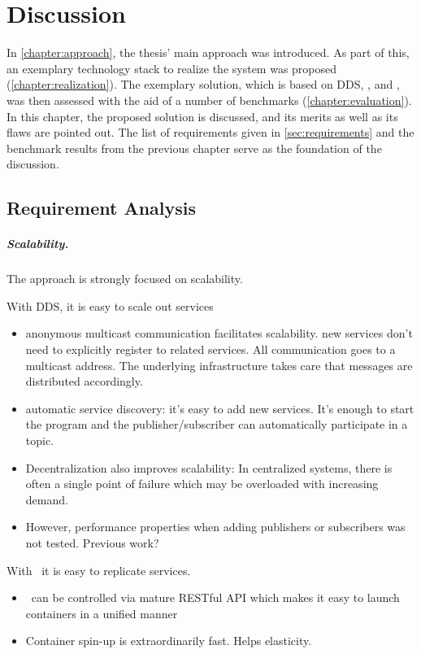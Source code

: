 \chapter{Discussion}\label{chapter:discussion}
In \autoref{chapter:approach}, the thesis' main approach was introduced. As part of this, an exemplary technology stack to realize the system was proposed (\cf \autoref{chapter:realization}). The exemplary solution, which is based on DDS, \docker , and \wnet , was then assessed with the aid of a number of benchmarks (\cf \autoref{chapter:evaluation}). In this chapter, the proposed solution is discussed, and its merits as well as its flaws are pointed out. The list of requirements given in \autoref{sec:requirements} and the benchmark results from the previous chapter serve as the foundation of the discussion. 


\section{Requirement Analysis}
\paragraph{Scalability.}
The approach is strongly focused on scalability. 

With DDS, it is easy to scale out services
\begin{itemize}
\item anonymous multicast communication facilitates scalability. new services don't need to explicitly register to related services. All communication goes to a multicast address. The underlying infrastructure takes care that messages are distributed accordingly.
\item automatic service discovery: it's easy to add new services. It's enough to start the program and the publisher/subscriber can automatically participate in a topic.
\item Decentralization also improves scalability: In centralized systems, there is often a single point of failure which may be overloaded with increasing demand. 
\item However, performance properties when adding publishers or subscribers was not tested. Previous work?
\end{itemize}

With \docker\ it is easy to replicate services. 
\begin{itemize}
\item \docker\ can be controlled via mature RESTful API which makes it easy to launch containers in a unified manner
\item Container spin-up is extraordinarily fast. Helps elasticity.
\end{itemize}

